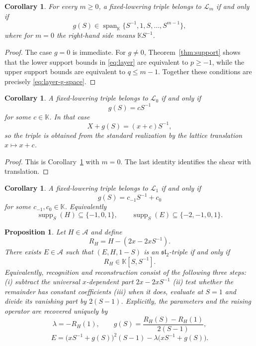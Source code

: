 \documentclass[11pt,reqno]{amsart}
\numberwithin{equation}{section}
\newtheorem{proposition}[theorem]{Proposition}
\newtheorem{corollary}[theorem]{Corollary}
\theoremstyle{definition}
\theoremstyle{remark}
\newcommand{\K}{\mathbb K}
\newcommand{\algA}{\mathcal A}
\newcommand{\calL}{\mathcal L}
\newcommand{\supp}{\operatorname{supp}}
\newcommand{\Span}{\operatorname{span}}
\begin{document}
\begin{corollary}\label{cor:all-layers}
For every $m\ge0$, a fixed-lowering triple belongs to $\calL_m$ if and only if
\begin{equation}\label{eq:layer-g-space}
 g(S)\in \Span_{\K}\{S^{-1},1,S,\ldots,S^{m-1}\},
\end{equation}
where for $m=0$ the right-hand side means $\K S^{-1}$.
\end{corollary}

\begin{proof}
The case $g=0$ is immediate.  For $g\ne0$, Theorem~\ref{thm:support} shows that the lower support bounds in \eqref{eq:layer} are equivalent to $p\ge-1$, while the upper support bounds are equivalent to $q\le m-1$.  Together these conditions are precisely \eqref{eq:layer-g-space}.
\end{proof}

\begin{corollary}\label{cor:minimal-layer}
A fixed-lowering triple belongs to $\calL_0$ if and only if
\[
 g(S)=cS^{-1}
\]
for some $c\in\K$.  In that case
\[
 X+g(S)=(x+c)S^{-1},
\]
so the triple is obtained from the standard realization by the lattice translation $x\mapsto x+c$.
\end{corollary}

\begin{proof}
This is Corollary~\ref{cor:all-layers} with $m=0$.  The last identity identifies the shear with translation.
\end{proof}

\begin{corollary}\label{cor:first-layer}
A fixed-lowering triple belongs to $\calL_1$ if and only if
\[
 g(S)=c_{-1}S^{-1}+c_0
\]
for some $c_{-1},c_0\in\K$.  Equivalently
\[
 \supp_S(H)\subseteq\{-1,0,1\},
 \qquad
 \supp_S(E)\subseteq\{-2,-1,0,1\}.
\]
\end{corollary}

\begin{proposition}\label{prop:recognition}
Let $H\in\algA$ and define
\[
 R_H=H-(2x-2xS^{-1}).
\]
There exists $E\in\algA$ such that $(E,H,1-S)$ is an $\mathfrak{sl}_2$-triple if and only if
\[
 R_H\in\K[S,S^{-1}].
\]
Equivalently, recognition and reconstruction consist of the following three steps: (i) subtract the universal $x$-dependent part $2x-2xS^{-1}$ (ii) test whether the remainder has constant coefficients (iii) when it does, evaluate at $S=1$ and divide its vanishing part by $2(S-1)$.  Explicitly, the parameters and the raising operator are recovered uniquely by
\begin{equation}\label{eq:recognition}
 \lambda=-R_H(1),
 \qquad
 g(S)=\frac{R_H(S)-R_H(1)}{2(S-1)},
\end{equation}
\[
 E=\bigl(xS^{-1}+g(S)\bigr)^2(S-1)
 -\lambda\bigl(xS^{-1}+g(S)\bigr).
\]
\end{proposition}
\end{document}
